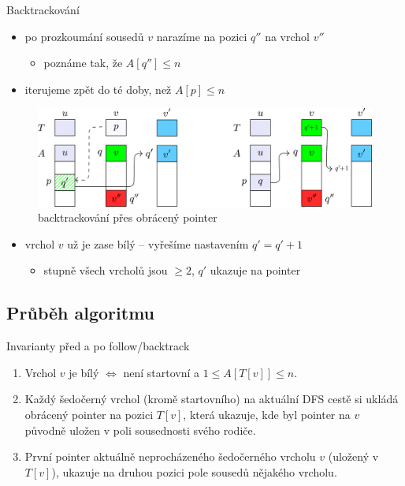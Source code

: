 \documentclass[czech]{beamer}
\begin{document}
	\begin{frame}{Backtrackování}
		\begin{itemize}
			\item po prozkoumání sousedů $v$ narazíme na pozici $q''$ na vrchol $v''$
			\begin{itemize}
				\item poznáme tak, že $A[q''] \le n$
			\end{itemize}
			\item iterujeme zpět do té doby, než $A[p] \le n$
		\end{itemize}
		\begin{figure}
			\centering
			\includegraphics{images/backtracking.png}
			\caption{backtrackování přes obrácený pointer}
		\end{figure}
		\vfill

		\begin{itemize}
			\item vrchol $v$ už je zase bílý -- vyřešíme nastavením $q' = q' + 1$
			\begin{itemize}
				\item stupně všech vrcholů jsou $\ge 2$, $q'$ ukazuje na  pointer
			\end{itemize}
		\end{itemize}
	\end{frame}
		
	\subsection{Průběh algoritmu}

	\begin{frame}{Invarianty před a po follow/backtrack}
		\begin{enumerate}
				\item Vrchol $v$ je bílý $\iff$ není startovní a $1 \le A[T[v]] \le n$.
				\item Každý šedočerný vrchol (kromě startovního) na aktuální DFS cestě si ukládá obrácený pointer na pozici $T[v]$, která ukazuje, kde byl pointer na $v$ původně uložen v poli sousednosti svého rodiče.
				\item První pointer aktuálně neprocházeného šedočerného vrcholu $v$ (uložený v $T[v]$), ukazuje na druhou pozici pole sousedů nějakého vrcholu.
		\end{enumerate}
	\end{frame}
\end{document}
